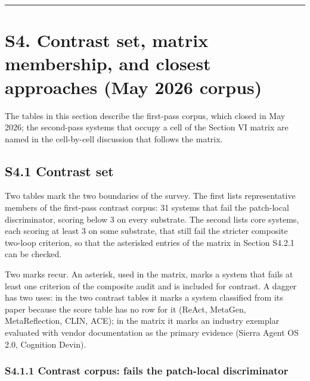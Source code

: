\documentclass[
]{article}
\begin{document}
\begin{center}\rule{0.5\linewidth}{0.5pt}\end{center}

\section{S4. Contrast set, matrix membership, and closest approaches
(May 2026
corpus)}\label{s4.-contrast-set-matrix-membership-and-closest-approaches-may-2026-corpus}

The tables in this section describe the first-pass corpus, which closed
in May 2026; the second-pass systems that occupy a cell of the Section
VI matrix are named in the cell-by-cell discussion that follows the
matrix.

\subsection{S4.1 Contrast set}\label{s4.1-contrast-set}

Two tables mark the two boundaries of the survey. The first lists
representative members of the first-pass contrast corpus: 31 systems
that fail the patch-local discriminator, scoring below 3 on every
substrate. The second lists core systems, each scoring at least 3 on
some substrate, that still fail the stricter composite two-loop
criterion, so that the asterisked entries of the matrix in Section
S4.2.1 can be checked.

Two marks recur. An asterisk, used in the matrix, marks a system that
fails at least one criterion of the composite audit and is included for
contrast. A dagger has two uses: in the two contrast tables it marks a
system classified from its paper because the score table has no row for
it (ReAct, MetaGen, MetaReflection, CLIN, ACE); in the matrix it marks
an industry exemplar evaluated with vendor documentation as the primary
evidence (Sierra Agent OS 2.0, Cognition Devin).

\subsubsection{S4.1.1 Contrast corpus: fails the patch-local
discriminator}\label{s4.1.1-contrast-corpus-fails-the-patch-local-discriminator}
\end{document}
